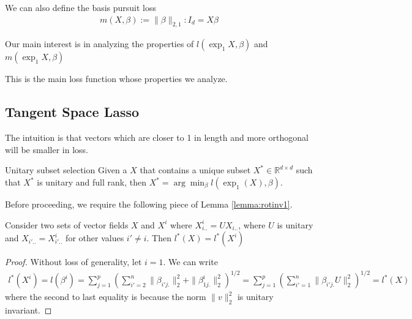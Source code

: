 \documentclass[a4paper,11pt]{article}
\begin{document}

We can also define the basis pursuit loss
\begin{align}
m (X, \beta) := \|\beta\|_{2,1} :  I_d = X\beta
\end{align}

Our main interest is in analyzing the properties of $l(\exp_1 X,  \beta)$ and $m(\exp_1 X,  \beta)$ 

This is the main loss function whose properties we analyze.



\subsection{Tangent Space Lasso}

The intuition is that vectors which are closer to 1 in length and more orthogonal will be smaller in loss.

\begin{proposition}{Unitary subset selection}
Given a $X$ that contains a unique subset $X^* \in \mathbb R^{d \times d} $ such that $X^*$ is unitary and full rank, then $X^* = \arg \min_\beta l(\exp_1(X),\beta)$.
\end{proposition}


Before proceeding, we require the following piece of Lemma \ref{lemma:rotinv1}. 
 \begin{proposition}
 \label{prop:unitarybasis}
Consider two sets of vector fields $X$ and $X^i$ where $X_{i..}^i = U X_{i..} $, where $U$ is unitary and $X_{i'..} = X_{i'..}^i$ for other values $i' \neq i$.
Then $l^*(X) = l^*(X^i)$
\end{proposition}

\begin{proof}
Without loss of generality, let $i = 1$.
We can write 
\begin{eqnarray}
l^*(X^i) = l(\beta^i) = \sum_{j = 1}^p (\sum_{i'=2}^n \| \beta_{i'j.} \|_2^2 +  \|  \beta_{1j.}^i \|_2^2 )^{1/2}=  \sum_{j = 1}^p (\sum_{i'=1}^n \| \beta_{i'j.} U \|_2^2)^{1/2} = l^*(X)
\end{eqnarray}
where the second to last equality is because the norm $\|v\|_2^2 $ is unitary invariant.
\end{proof}
\end{document}
